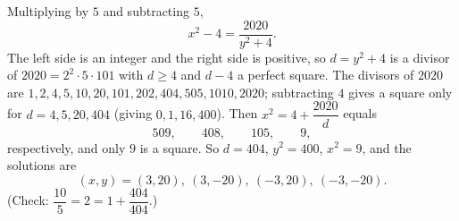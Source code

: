 Multiplying by $5$ and subtracting $5$,
\[x^2-4=\dfrac{2020}{y^2+4}.\]
The left side is an integer and the right side is positive, so $d=y^2+4$ is a divisor of $2020=2^2\cdot5\cdot101$ with $d\ge4$ and $d-4$ a perfect square. The divisors of $2020$ are $1,2,4,5,10,20,101,202,404,505,1010,2020$; subtracting $4$ gives a square only for $d=4,5,20,404$ (giving $0,1,16,400$). Then $x^2=4+\dfrac{2020}{d}$ equals
\[509,\qquad408,\qquad105,\qquad9,\]
respectively, and only $9$ is a square. So $d=404$, $y^2=400$, $x^2=9$, and the solutions are
\[\boxed{(x,y)=(3,20),\ (3,-20),\ (-3,20),\ (-3,-20)}.\]
(Check: $\dfrac{10}{5}=2=1+\dfrac{404}{404}$.)
